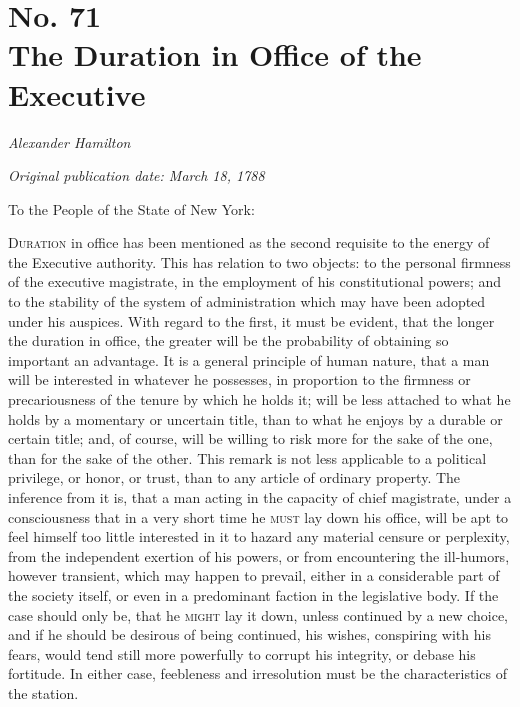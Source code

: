 \chapter[No. 71: The Duration in Office of the Executive]{No. 71\\ {\small The Duration in Office of the Executive}}

\textit{Alexander Hamilton}

\textit{Original publication date: March 18, 1788}
\vspace{1cm}

To the People of the State of New York:
\vspace{.4cm}

\textsc{Duration} in office has been mentioned as the second requisite to the energy of the Executive authority. 
This has relation to two objects: to the personal firmness of the executive magistrate, in the employment of his constitutional powers; and to the stability of the system of administration which may have been adopted under his auspices. 
With regard to the first, it must be evident, that the longer the duration in office, the greater will be the probability of obtaining so important an advantage. 
It is a general principle of human nature, that a man will be interested in whatever he possesses, in proportion to the firmness or precariousness of the tenure by which he holds it; will be less attached to what he holds by a momentary or uncertain title, than to what he enjoys by a durable or certain title; and, of course, will be willing to risk more for the sake of the one, than for the sake of the other. 
This remark is not less applicable to a political privilege, or honor, or trust, than to any article of ordinary property. 
The inference from it is, that a man acting in the capacity of chief magistrate, under a consciousness that in a very short time he \textsc{must} lay down his office, will be apt to feel himself too little interested in it to hazard any material censure or perplexity, from the independent exertion of his powers, or from encountering the ill-humors, however transient, which may happen to prevail, either in a considerable part of the society itself, or even in a predominant faction in the legislative body. 
If the case should only be, that he \textsc{might} lay it down, unless continued by a new choice, and if he should be desirous of being continued, his wishes, conspiring with his fears, would tend still more powerfully to corrupt his integrity, or debase his fortitude. 
In either case, feebleness and irresolution must be the characteristics of the station.

